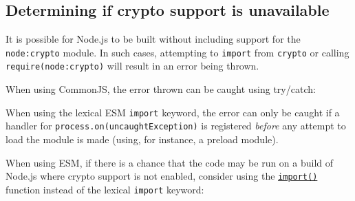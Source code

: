\subsection{Determining if crypto support is
unavailable}\label{determining-if-crypto-support-is-unavailable}

It is possible for Node.js to be built without including support for the
\texttt{node:crypto} module. In such cases, attempting to
\texttt{import} from \texttt{crypto} or calling
\texttt{require(\textquotesingle{}node:crypto\textquotesingle{})} will
result in an error being thrown.

When using CommonJS, the error thrown can be caught using try/catch:

\begin{Shaded}
\begin{Highlighting}[]
\OperatorTok{;}
\NormalTok{ \{}
\OperatorTok{=} \NormalTok{(}\NormalTok{)}\OperatorTok{;}
\NormalTok{\} }
  \NormalTok{(}\NormalTok{)}\OperatorTok{;}
\NormalTok{\}}
\end{Highlighting}
\end{Shaded}

When using the lexical ESM \texttt{import} keyword, the error can only
be caught if a handler for
\texttt{process.on(\textquotesingle{}uncaughtException\textquotesingle{})}
is registered \emph{before} any attempt to load the module is made
(using, for instance, a preload module).

When using ESM, if there is a chance that the code may be run on a build
of Node.js where crypto support is not enabled, consider using the
\href{https://developer.mozilla.org/en-US/docs/Web/JavaScript/Reference/Operators/import}{\texttt{import()}}
function instead of the lexical \texttt{import} keyword:

\begin{Shaded}
\begin{Highlighting}[]
\OperatorTok{;}
\NormalTok{ \{}
\OperatorTok{=}  \NormalTok{(}\NormalTok{)}\OperatorTok{;}
\NormalTok{\} }
  \NormalTok{(}\NormalTok{)}\OperatorTok{;}
\NormalTok{\}}
\end{Highlighting}
\end{Shaded}

